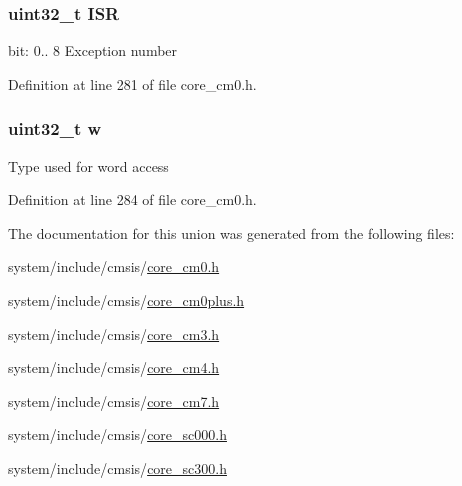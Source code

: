 \subsubsection[{\texorpdfstring{I\+SR}{ISR}}]{\setlength{\rightskip}{0pt plus 5cm}uint32\+\_\+t I\+SR}\hypertarget{union_i_p_s_r___type_ad502ba7dbb2aab5f87c782b28f02622d}{}\label{union_i_p_s_r___type_ad502ba7dbb2aab5f87c782b28f02622d}
bit\+: 0.. 8 Exception number 

Definition at line 281 of file core\+\_\+cm0.\+h.

\subsubsection[{\texorpdfstring{w}{w}}]{\setlength{\rightskip}{0pt plus 5cm}uint32\+\_\+t w}\hypertarget{union_i_p_s_r___type_ad0fb62e7a08e70fc5e0a76b67809f84b}{}\label{union_i_p_s_r___type_ad0fb62e7a08e70fc5e0a76b67809f84b}
Type used for word access 

Definition at line 284 of file core\+\_\+cm0.\+h.



The documentation for this union was generated from the following files\+:\begin{DoxyCompactItemize}
\item 
system/include/cmsis/\hyperlink{core__cm0_8h}{core\+\_\+cm0.\+h}\item 
system/include/cmsis/\hyperlink{core__cm0plus_8h}{core\+\_\+cm0plus.\+h}\item 
system/include/cmsis/\hyperlink{core__cm3_8h}{core\+\_\+cm3.\+h}\item 
system/include/cmsis/\hyperlink{core__cm4_8h}{core\+\_\+cm4.\+h}\item 
system/include/cmsis/\hyperlink{core__cm7_8h}{core\+\_\+cm7.\+h}\item 
system/include/cmsis/\hyperlink{core__sc000_8h}{core\+\_\+sc000.\+h}\item 
system/include/cmsis/\hyperlink{core__sc300_8h}{core\+\_\+sc300.\+h}\end{DoxyCompactItemize}
